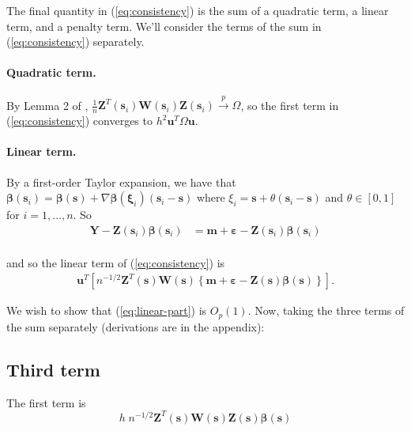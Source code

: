 \documentclass[authoryear, review, 11pt]{elsarticle}
\begin{document}
    The final quantity in (\ref{eq:consistency}) is the sum of a quadratic term, a linear term, and a penalty term. We'll consider the terms of the sum in (\ref{eq:consistency}) separately.
  
    \paragraph{Quadratic term.} By Lemma 2 of \cite{Sun-Yan-Zhang-Lu-2014}, $\frac{1}{n} \bm{Z}^T(\bm{s}_i) \bm{W}(\bm{s}_i) \bm{Z}(\bm{s}_i) \xrightarrow{p} \Omega$, so the first term in (\ref{eq:consistency}) converges to $h^2 \bm{u}^T \Omega \bm{u}$.
  
    \paragraph{Linear term.} By a first-order Taylor expansion, we have that $\bm{\beta}(\bm{s}_i) = \bm{\beta}(\bm{s}) + \nabla \bm{\beta}(\bm{\xi}_{i}) (\bm{s}_i - \bm{s})$ where $\xi_i = \bm{s} + \theta (\bm{s}_i - \bm{s})$ and $\theta \in [0, 1]$ for $i = 1, \dots, n$. So
    \begin{align*}
        \bm{Y} - \bm{Z}(\bm{s}_i) \bm{\beta}(\bm{s}_i) &= \bm{m} + \bm{\varepsilon} - \bm{Z}(\bm{s}_i) \bm{\beta}(\bm{s}_i) \\
    \end{align*}
  
    and so the linear term of (\ref{eq:consistency}) is
    \begin{align}\label{eq:linear-part}
        \bm{u}^T \left[ n^{-1/2} \bm{Z}^T(\bm{s}) \bm{W}(\bm{s}) \left\{ \bm{m} + \bm{\varepsilon} - \bm{Z}(\bm{s}) \bm{\beta}(\bm{s})  \right\} \right].
    \end{align}
  
    We wish to show that (\ref{eq:linear-part}) is $O_p(1)$.  Now, taking the three terms of the sum separately (derivations are in the appendix):

    




    
    \subsection{Third term}
        The first term is 
        \begin{equation} \label{eq:m-term}
            h \; n^{-1/2} \bm{Z}^T(\bm{s}) \bm{W}(\bm{s}) \bm{Z}(\bm{s}) \bm{\beta}(\bm{s})
        \end{equation}
\end{document}
